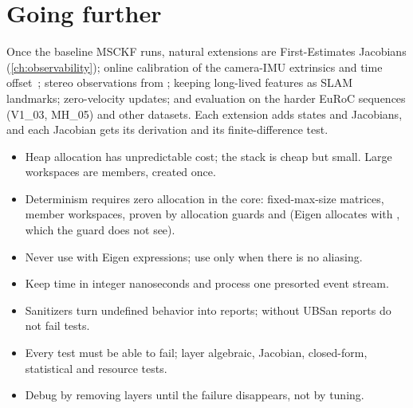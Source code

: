 \section{Going further}

Once the baseline MSCKF runs, natural extensions are First-Estimates Jacobians (\cref{ch:observability}); online calibration of the
camera-IMU extrinsics and time offset~\cite{li2013msckf2, li2014timeoffset}; stereo observations from ; keeping long-lived
features as SLAM landmarks; zero-velocity updates; and evaluation on the harder EuRoC sequences (V1\_03, MH\_05) and other
datasets. Each extension adds states and Jacobians, and each Jacobian gets its derivation and its finite-difference test.

\begin{takeaways}
\begin{itemize}
  \item Heap allocation has unpredictable cost; the stack is cheap but small. Large workspaces are members, created once.
  \item Determinism requires zero allocation in the core: fixed-max-size matrices, member workspaces, proven by allocation guards and
         (Eigen allocates with , which the guard does not see).
  \item Never use  with Eigen expressions; use  only when there is no aliasing.
  \item Keep time in integer nanoseconds and process one presorted event stream.
  \item Sanitizers turn undefined behavior into reports; without  UBSan reports do not fail tests.
  \item Every test must be able to fail; layer algebraic, Jacobian, closed-form, statistical and resource tests.
  \item Debug by removing layers until the failure disappears, not by tuning.
\end{itemize}
\end{takeaways}

